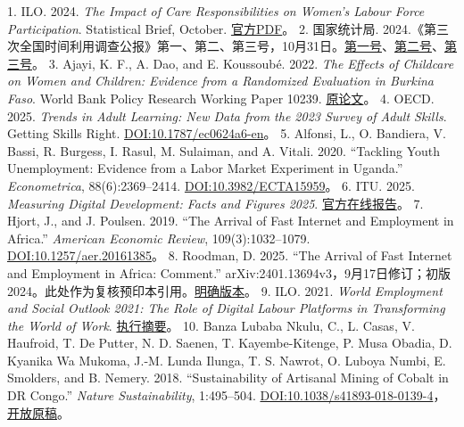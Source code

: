 \documentclass[UTF8,fontset=windows,12pt,a4paper,oneside,openany]{ctexbook}
\begin{document}
1. ILO. 2024. \emph{The Impact of Care Responsibilities on Women’s Labour Force Participation}. Statistical Brief, October. \href{https://www.ilo.org/sites/default/files/2024-10/GEDI-STAT\%20brief_formatted_28.10.24_final.pdf}{官方PDF}。
2. 国家统计局. 2024.《第三次全国时间利用调查公报》第一、第二、第三号，10月31日。\href{https://www.stats.gov.cn/xxgk/sjfb/zxfb2020/202410/t20241031_1957217.html}{第一号}、\href{https://www.stats.gov.cn/xxgk/sjfb/zxfb2020/202410/t20241031_1957216.html}{第二号}、\href{https://www.stats.gov.cn/xxgk/sjfb/zxfb2020/202410/t20241031_1957215.html}{第三号}。
3. Ajayi, K. F., A. Dao, and E. Koussoubé. 2022. \emph{The Effects of Childcare on Women and Children: Evidence from a Randomized Evaluation in Burkina Faso}. World Bank Policy Research Working Paper 10239. \href{https://documents1.worldbank.org/curated/en/099215111282254210/pdf/IDU09ee54b690865904f71089a60d76ad621601c.pdf}{原论文}。
4. OECD. 2025. \emph{Trends in Adult Learning: New Data from the 2023 Survey of Adult Skills}. Getting Skills Right. \href{https://doi.org/10.1787/ec0624a6-en}{DOI:10.1787/ec0624a6-en}。
5. Alfonsi, L., O. Bandiera, V. Bassi, R. Burgess, I. Rasul, M. Sulaiman, and A. Vitali. 2020. “Tackling Youth Unemployment: Evidence from a Labor Market Experiment in Uganda.” \emph{Econometrica}, 88(6):2369–2414. \href{https://doi.org/10.3982/ECTA15959}{DOI:10.3982/ECTA15959}。
6. ITU. 2025. \emph{Measuring Digital Development: Facts and Figures 2025}. \href{https://www.itu.int/itu-d/reports/statistics/facts-figures-2025/}{官方在线报告}。
7. Hjort, J., and J. Poulsen. 2019. “The Arrival of Fast Internet and Employment in Africa.” \emph{American Economic Review}, 109(3):1032–1079. \href{https://doi.org/10.1257/aer.20161385}{DOI:10.1257/aer.20161385}。
8. Roodman, D. 2025. “The Arrival of Fast Internet and Employment in Africa: Comment.” arXiv:2401.13694v3，9月17日修订；初版2024。此处作为复核预印本引用。\href{https://arxiv.org/abs/2401.13694v3}{明确版本}。
9. ILO. 2021. \emph{World Employment and Social Outlook 2021: The Role of Digital Labour Platforms in Transforming the World of Work}. \href{https://www.ilo.org/sites/default/files/wcmsp5/groups/public/\%40dgreports/\%40dcomm/documents/publication/wcms_771672.pdf}{执行摘要}。
10. Banza Lubaba Nkulu, C., L. Casas, V. Haufroid, T. De Putter, N. D. Saenen, T. Kayembe-Kitenge, P. Musa Obadia, D. Kyanika Wa Mukoma, J.-M. Lunda Ilunga, T. S. Nawrot, O. Luboya Numbi, E. Smolders, and B. Nemery. 2018. “Sustainability of Artisanal Mining of Cobalt in DR Congo.” \emph{Nature Sustainability}, 1:495–504. \href{https://doi.org/10.1038/s41893-018-0139-4}{DOI:10.1038/s41893-018-0139-4}，\href{https://pmc.ncbi.nlm.nih.gov/articles/PMC6166862/}{开放原稿}。
\end{document}
